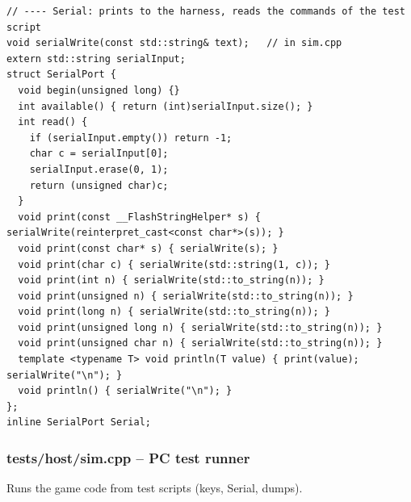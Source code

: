 \documentclass[11pt,a4paper]{article}
\begin{document}
\begin{lstlisting}[language=Arduino]
// ---- Serial: prints to the harness, reads the commands of the test script
void serialWrite(const std::string& text);   // in sim.cpp
extern std::string serialInput;
struct SerialPort {
  void begin(unsigned long) {}
  int available() { return (int)serialInput.size(); }
  int read() {
    if (serialInput.empty()) return -1;
    char c = serialInput[0];
    serialInput.erase(0, 1);
    return (unsigned char)c;
  }
  void print(const __FlashStringHelper* s) { serialWrite(reinterpret_cast<const char*>(s)); }
  void print(const char* s) { serialWrite(s); }
  void print(char c) { serialWrite(std::string(1, c)); }
  void print(int n) { serialWrite(std::to_string(n)); }
  void print(unsigned n) { serialWrite(std::to_string(n)); }
  void print(long n) { serialWrite(std::to_string(n)); }
  void print(unsigned long n) { serialWrite(std::to_string(n)); }
  void print(unsigned char n) { serialWrite(std::to_string(n)); }
  template <typename T> void println(T value) { print(value); serialWrite("\n"); }
  void println() { serialWrite("\n"); }
};
inline SerialPort Serial;
\end{lstlisting}

\subsubsection*{tests/host/sim.cpp – PC test runner}
Runs the game code from test scripts (keys, Serial, dumps).
\end{document}
